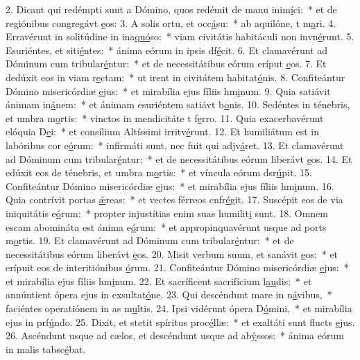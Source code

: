 2. Dicant qui redémpti sunt a Dómino, quos redémit de manu inim\uline{í}ci:~* et de regiónibus congregávt \uline{e}os:
3. A solis ortu, et occ\uline{á}su:~* ab aquilóne, t m\uline{a}ri.
4. Erravérunt in solitúdine in ina\uline{quó}so:~* viam civitátis habitáculi non invn\uline{é}runt.
5. Esuriéntes, et siti\uline{é}ntes:~* ánima eórum in ipsis df\uline{é}cit.
6. Et clamavérunt ad Dóminum cum tribular\uline{é}ntur:~* et de necessitátibus eórum eríput \uline{e}os.
7. Et dedúxit eos in viam r\uline{e}ctam:~* ut irent in civitátem habitat\uline{ó}nis.
8. Confiteántur Dómino misericórdiæ \uline{e}jus:~* et mirabília ejus fíliis hm\uline{i}num.
9. Quia satiávit ánimam in\uline{á}nem:~* et ánimam esuriéntem satiávt b\uline{o}nis.
10. Sedéntes in ténebris, et umbra m\uline{o}rtis:~* vinctos in mendicitáte t f\uline{e}rro.
11. Quia exacerbavérunt elóquia D\uline{e}i:~* et consílium Altíssimi irritv\uline{é}runt.
12. Et humiliátum est in labóribus cor e\uline{ó}rum:~* infirmáti sunt, nec fuit qui adjv\uline{á}ret.
13. Et clamavérunt ad Dóminum cum tribular\uline{é}ntur:~* et de necessitátibus eórum liberávt \uline{e}os.
14. Et edúxit eos de ténebris, et umbra m\uline{o}rtis:~* et víncula eórum dsr\uline{ú}pit.
15. Confiteántur Dómino misericórdiæ \uline{e}jus:~* et mirabília ejus fíliis hm\uline{i}num.
16. Quia contrívit portas \uline{ǽ}reas:~* et vectes férreos cnfr\uline{é}git.
17. Suscépit eos de via iniquitátis e\uline{ó}rum:~* propter injustítias enim suas humilit\uline{i} sunt.
18. Omnem escam abomináta est ánima e\uline{ó}rum:~* et appropinquavérunt usque ad ports m\uline{o}rtis.
19. Et clamavérunt ad Dóminum cum tribular\uline{é}ntur:~* et de necessitátibus eórum liberávt \uline{e}os.
20. Misit verbum suum, et sanávit \uline{e}os:~* et erípuit eos de interitiónibus \uline{ó}rum.
21. Confiteántur Dómino misericórdiæ \uline{e}jus:~* et mirabília ejus fíliis hm\uline{i}num.
22. Et sacríficent sacrifícium l\uline{au}dis:~* et annúntient ópera ejus in exsultat\uline{ó}ne.
23. Qui descéndunt mare in n\uline{á}vibus,~* faciéntes operatiónem in as m\uline{u}ltis.
24. Ipsi vidérunt ópera D\uline{ó}mini,~* et mirabília ejus in prf\uline{ú}ndo.
25. Dixit, et stetit spíritus proc\uline{é}llæ:~* et exaltáti sunt flucts \uline{e}jus.
26. Ascéndunt usque ad cælos, et descéndunt usque ad ab\uline{ý}ssos:~* ánima eórum in malis tabsc\uline{é}bat.

